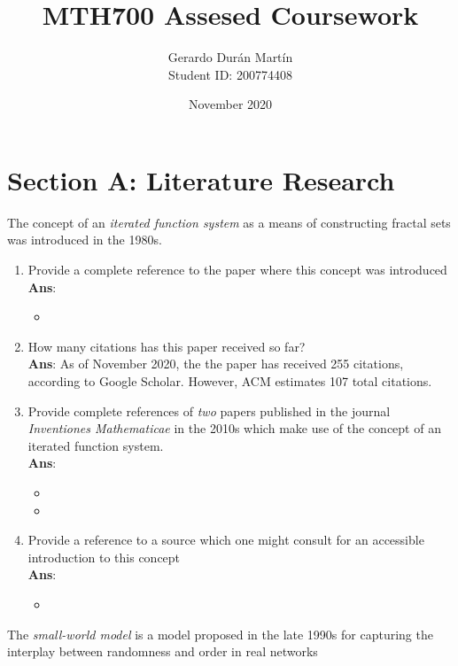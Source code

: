 \documentclass[11pt]{article}
\title{MTH700 Assesed Coursework}
\author{Gerardo Durán Martín\\Student ID: 200774408}
\date{November 2020}
\begin{document}
\maketitle

\section*{Section A: Literature Research}
The concept of an \textit{iterated function system} as a means of constructing fractal sets was introduced in the 1980s.
\begin{enumerate}[label=(\alph*)]
	\item Provide a complete reference to the paper where this concept was introduced \\ \textbf{Ans}:
	\begin{itemize}
	\item {}
	\end{itemize}
	\item How many citations has this paper received so far? \\ \textbf{Ans}: As of November 2020, the the paper has received 255 citations, according to Google Scholar. However, ACM estimates 107 total citations. 
	\item Provide complete references of \textit{two} papers published in the journal \textit{Inventiones Mathematicae} in the 2010s which make use of the concept of an iterated function system. \\ \textbf{Ans}:
	\begin{itemize}
		\item {}
		\item {}
	\end{itemize}
	\item Provide a reference to a source which one might consult for an accessible introduction to this concept \\ \textbf{Ans}:
	\begin{itemize}
		\item {}
	\end{itemize}
\end{enumerate}

The \textit{small-world model} is a model proposed in the late 1990s for capturing the interplay between randomness and order in real networks
\end{document}
